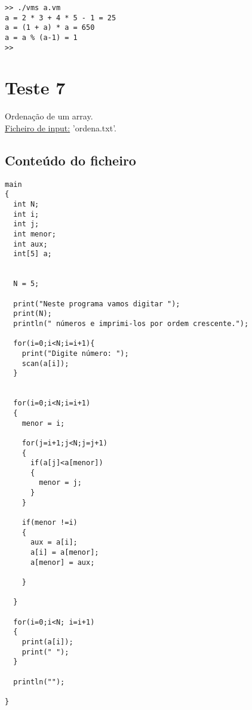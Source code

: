 \documentclass[11pt,a4paper]{report}%
\begin{document}
\begin{verbatim}
>> ./vms a.vm
a = 2 * 3 + 4 * 5 - 1 = 25
a = (1 + a) * a = 650
a = a % (a-1) = 1
>>
\end{verbatim}

\section{Teste 7}
Ordenação de um array. \\
\underline{Ficheiro de input:} 'ordena.txt'.

\subsection{Conteúdo do ficheiro}

\begin{verbatim}
main
{
  int N;
  int i;
  int j;
  int menor;
  int aux;
  int[5] a;
  

  N = 5;

  print("Neste programa vamos digitar ");
  print(N);
  println(" números e imprimi-los por ordem crescente.");

  for(i=0;i<N;i=i+1){
    print("Digite número: ");
    scan(a[i]); 
  }
  

  for(i=0;i<N;i=i+1)
  {
    menor = i;

    for(j=i+1;j<N;j=j+1)
    {
      if(a[j]<a[menor])
      {
        menor = j;
      }
    }
    
    if(menor !=i)
    {
      aux = a[i];
      a[i] = a[menor];
      a[menor] = aux;

    }

  } 

  for(i=0;i<N; i=i+1)
  {
    print(a[i]);
    print(" ");
  }

  println("");
  
}
\end{verbatim}
\end{document}

